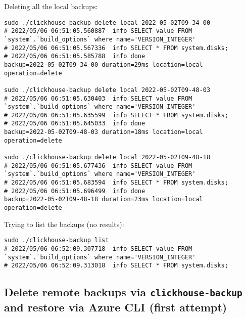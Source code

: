 Deleting all the local backups:
\begin{verbatim}
sudo ./clickhouse-backup delete local 2022-05-02T09-34-00
# 2022/05/06 06:51:05.560887  info SELECT value FROM `system`.`build_options` where name='VERSION_INTEGER'
# 2022/05/06 06:51:05.567336  info SELECT * FROM system.disks;
# 2022/05/06 06:51:05.585788  info done                      backup=2022-05-02T09-34-00 duration=29ms location=local operation=delete

sudo ./clickhouse-backup delete local 2022-05-02T09-48-03
# 2022/05/06 06:51:05.630403  info SELECT value FROM `system`.`build_options` where name='VERSION_INTEGER'
# 2022/05/06 06:51:05.635599  info SELECT * FROM system.disks;
# 2022/05/06 06:51:05.645033  info done                      backup=2022-05-02T09-48-03 duration=18ms location=local operation=delete

sudo ./clickhouse-backup delete local 2022-05-02T09-48-18
# 2022/05/06 06:51:05.677436  info SELECT value FROM `system`.`build_options` where name='VERSION_INTEGER'
# 2022/05/06 06:51:05.683594  info SELECT * FROM system.disks;
# 2022/05/06 06:51:05.696499  info done                      backup=2022-05-02T09-48-18 duration=23ms location=local operation=delete
\end{verbatim}

Trying to list the backups (no results):
\begin{verbatim}
sudo ./clickhouse-backup list
# 2022/05/06 06:52:09.307718  info SELECT value FROM `system`.`build_options` where name='VERSION_INTEGER'
# 2022/05/06 06:52:09.313018  info SELECT * FROM system.disks;
\end{verbatim}

\subsection{Delete remote backups via \texttt{clickhouse-backup} and restore via Azure CLI (first attempt)}
\label{sec:orgc78125c}
